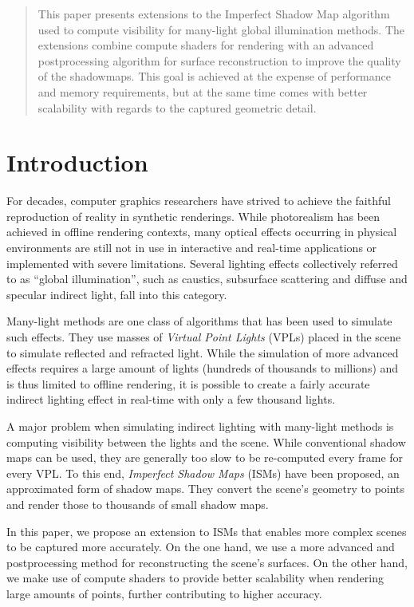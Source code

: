 

\begin{abstract}
This paper presents extensions to the Imperfect Shadow Map algorithm used to compute visibility for many-light global illumination methods. The extensions combine compute shaders for rendering with an advanced postprocessing algorithm for surface reconstruction to improve the quality of the shadowmaps. This goal is achieved at the expense of performance and memory requirements, but at the same time comes with better scalability with regards to the captured geometric detail.
\end{abstract}



\section{Introduction}
For decades, computer graphics researchers have strived to achieve the faithful reproduction of reality in synthetic renderings. While photorealism has been achieved in offline rendering contexts, many optical effects occurring in physical environments are still not in use in interactive and real-time applications or implemented with severe limitations. Several lighting effects collectively referred to as ``global illumination'', such as caustics, subsurface scattering and diffuse and specular indirect light, fall into this category.

Many-light methods are one class of algorithms that has been used to simulate such effects. They use masses of \textit{Virtual Point Lights} (VPLs) placed in the scene to simulate reflected and refracted light. While the simulation of more advanced effects requires a large amount of lights (hundreds of thousands to millions) and is thus limited to offline rendering, it is possible to create a fairly accurate indirect lighting effect in real-time with only a few thousand lights.

A major problem when simulating indirect lighting with many-light methods is computing visibility between the lights and the scene. While conventional shadow maps can be used, they are generally too slow to be re-computed every frame for every VPL. To this end, \textit{Imperfect Shadow Maps} (ISMs) have been proposed, an approximated form of shadow maps. They convert the scene's geometry to points and render those to thousands of small shadow maps.

In this paper, we propose an extension to ISMs that enables more complex scenes to be captured more accurately. On the one hand, we use a more advanced and postprocessing method for reconstructing the scene's surfaces. On the other hand, we make use of compute shaders to provide better scalability when rendering large amounts of points, further contributing to higher accuracy.




